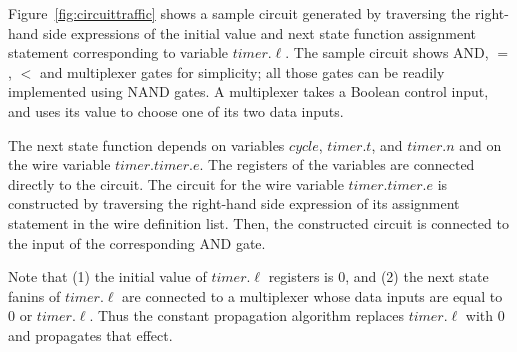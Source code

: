 %

\begin{example}
Figure~\ref{fig:circuittraffic} shows a sample circuit generated 
by traversing the right-hand side expressions of the initial 
value and next state function assignment statement corresponding to variable
$timer.\ell$. 
The sample circuit shows AND, $=$, $<$ and multiplexer gates for simplicity; 
all those gates can be readily implemented using NAND gates. 
A multiplexer takes a Boolean control input, and uses its value to 
choose one of its two data inputs. 

The next state function depends on variables $cycle$, $timer.t$, and $timer.n$ and on 
the wire variable $timer.timer.e$. 
The registers of the variables are connected directly to the circuit. 
The circuit for the wire variable $timer.timer.e$ is constructed by traversing 
the right-hand side expression of its 
assignment statement in the wire definition list. 
Then, the constructed circuit is connected to the input of the corresponding AND gate. 

Note that (1) the initial value of $timer.\ell$ registers is $0$, and  (2) the next state fanins of $timer.\ell$ are connected to a multiplexer whose data inputs are equal to $0$ or $timer.\ell$. Thus the constant propagation algorithm replaces $timer.\ell$ with $0$ and propagates that effect. 

\end{example}
